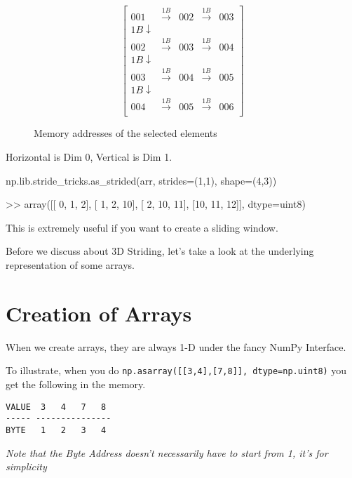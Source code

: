 \documentclass[oneside, 12pt]{report}
\begin{document}
\begin{figure}[H]
\begin{equation*}
\begin{bmatrix}
001 & \xrightarrow{1B} & 002 &\xrightarrow{1B} & 003 \\
1B \downarrow \\
002 & \xrightarrow{1B} & 003 &\xrightarrow{1B} & 004 \\
1B \downarrow \\
003 & \xrightarrow{1B} & 004 &\xrightarrow{1B} & 005 \\
1B \downarrow \\
004 & \xrightarrow{1B} & 005 &\xrightarrow{1B} & 006 \\
\end{bmatrix}
\end{equation*}
\caption{Memory addresses of the selected elements}
\end{figure}

\begin{shaded}
Horizontal is Dim 0, Vertical is Dim 1.
\end{shaded}

\begin{python}
np.lib.stride_tricks.as_strided(arr, strides=(1,1), shape=(4,3))

>> array([[ 0,  1,  2],
          [ 1,  2, 10],
          [ 2, 10, 11],
          [10, 11, 12]], dtype=uint8)
\end{python}

This is extremely useful if you want to create a sliding window.

Before we discuss about 3D Striding, let's take a look at the underlying representation of some arrays.

\section{Creation of Arrays}

When we create arrays, they are always 1-D under the fancy NumPy Interface.

To illustrate, when you do \verb+np.asarray([[3,4],[7,8]], dtype=np.uint8)+ you get the following in the memory.

\begin{verbatim}
VALUE  3   4   7   8
----- ---------------
BYTE   1   2   3   4
\end{verbatim}

\textit{Note that the Byte Address doesn't necessarily have to start from 1, it's for simplicity}
\end{document}
